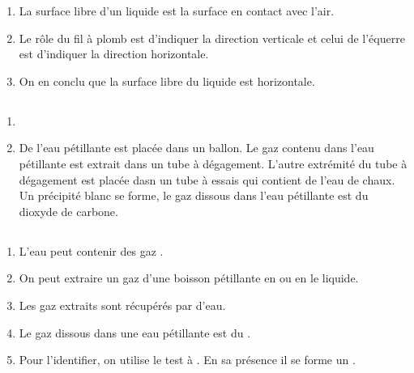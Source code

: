 \documentclass[12pt,a4paper]{article}
\begin{document}
\begin{enumerate}[label=\alph*)]
	\item La surface libre d'un liquide est la surface en contact avec l'air.
	\item Le rôle du fil à plomb est d'indiquer la direction verticale et celui de l'équerre est d'indiquer la direction horizontale.
	\item On en conclu que la surface libre du liquide est horizontale.
\end{enumerate}
\subsection*{}

\begin{enumerate}[label=\alph*)]
	\item {}
	
	\item De l'eau pétillante est placée dans un ballon. Le gaz contenu dans l'eau pétillante est extrait dans un tube à dégagement. L'autre extrémité du tube à dégagement est placée dasn un tube à essais qui contient de l'eau de chaux. Un précipité blanc se forme, le gaz dissous dans l'eau pétillante est du dioxyde de carbone.
\end{enumerate}

\subsection*{}

\begin{enumerate}[label=\alph*)]
	\item L'eau peut contenir des gaz .
	\item On peut extraire un gaz d'une boisson pétillante en  ou en  le liquide.
	\item Les gaz extraits sont récupérés par  d'eau.
	\item Le gaz dissous dans une eau pétillante est du .
	\item Pour l'identifier, on utilise le test à . En sa présence il se forme un .
\end{enumerate}
\end{document}
